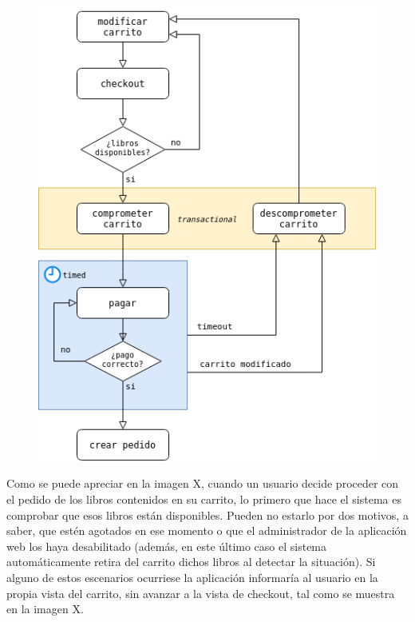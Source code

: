 \documentclass[a4paper]{report}
\begin{document}
    \begin{figure}[hbt!]
    	\centering
    	\includegraphics[width=\textwidth]{cart_diagram}
    \end{figure}
    
    Como se puede apreciar en la imagen X, cuando un usuario decide proceder con el pedido de los libros contenidos en su carrito, lo primero que hace el sistema es comprobar que esos libros están disponibles. Pueden no estarlo por dos motivos, a saber, que estén agotados en ese momento o que el administrador de la aplicación web los haya desabilitado (además, en este último caso el sistema automáticamente retira del carrito dichos libros al detectar la situación). Si alguno de estos escenarios ocurriese la aplicación informaría al usuario en la propia vista del carrito, sin avanzar a la vista de checkout, tal como se muestra en la imagen X.
    \\
    
\end{document}

